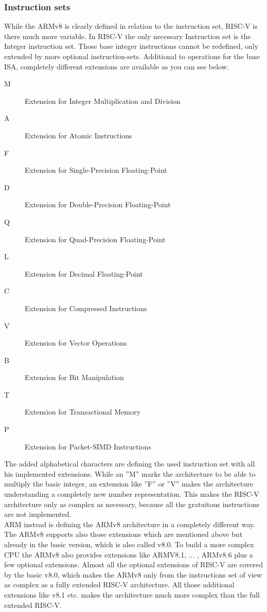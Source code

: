 \documentclass[conference]{IEEEtran}
\begin{document}
	\subsubsection{Instruction sets}
	While the ARMv8 is clearly defined in relation to the instruction set, RISC-V is there much more variable. In RISC-V the only necessary Instruction set is the Integer instruction set. Those base integer instructions cannot be redefined, only extended by more optional instruction-sets. Additional to operations for the base \gls{ISA}, completely different extensions are available as you can see below.
	\begin{description}
	\item[M]	Extension for Integer Multiplication and Division
	\item[A]	Extension for Atomic Instructions
	\item[F]	Extension for Single-Precision Floating-Point
	\item[D]	Extension for Double-Precision Floating-Point
	\item[Q]	Extension for Quad-Precision Floating-Point
	\item[L]	Extension for Decimal Floating-Point
	\item[C] 	Extension for Compressed Instructions
	\item[V]	Extension for Vector Operations
	\item[B]	Extension for Bit Manipulation
	\item[T]	Extension for Transactional Memory
	\item[P]	Extension for Packet-SIMD Instructions
	\end{description}
The added alphabetical characters are defining the used instruction set with all his implemented extensions. While an ''M'' marks the architecture to be able to multiply the basic integer, an extension like ''F'' or ''V'' makes the architecture understanding a completely new number representation. This makes the RISC-V architecture only as complex as necessary, because all the gratuitous instructions are not implemented. \cite{Asanovic2016} \\
ARM instead is defining the ARMv8 architecture in a completely different way. The ARMv8 supports also those extensions which are mentioned above but already in the basic version, which is also called v8.0. To build a more complex CPU the ARMv8 also provides extensions like ARMV8.1, ... , ARMv8.6 plus a few optional extensions.  Almost all the optional extensions of RISC-V are covered by the basic v8.0, which makes the ARMv8 only from the instructions set of view as complex as a fully extended RISC-V architecture. All those additional extensions like v8.1 etc. makes the architecture much more complex than the full extended RISC-V. \cite{ArmManual} \\
\end{document}
